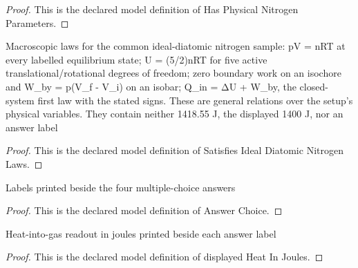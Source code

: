 \begin{proof}
  This is the declared model definition of Has Physical Nitrogen Parameters.
\end{proof}
\begin{definition}
  \label{def:physics:phyx-mini-0409:phyxminiproblems-problemphyxmini0409-satisfiesidealdiatomicnitrogenlaws}
  Macroscopic laws for the common ideal-diatomic nitrogen sample: pV = nRT at every labelled equilibrium state; U = (5/2)nRT for five active translational/rotational degrees of freedom; zero boundary work on an isochore and W\_by = p(V\_f - V\_i) on an isobar; Q\_in = ΔU + W\_by, the closed-system first law with the stated signs. These are general relations over the setup's physical variables. They contain neither 1418.55 J, the displayed 1400 J, nor an answer label
\end{definition}
\begin{proof}
  This is the declared model definition of Satisfies Ideal Diatomic Nitrogen Laws.
\end{proof}
\begin{definition}
  \label{def:physics:phyx-mini-0409:phyxminiproblems-problemphyxmini0409-answerchoice}
  Labels printed beside the four multiple-choice answers
\end{definition}
\begin{proof}
  This is the declared model definition of Answer Choice.
\end{proof}
\begin{definition}
  \label{def:physics:phyx-mini-0409:phyxminiproblems-problemphyxmini0409-displayedheatinjoules}
  Heat-into-gas readout in joules printed beside each answer label
\end{definition}
\begin{proof}
  This is the declared model definition of displayed Heat In Joules.
\end{proof}
